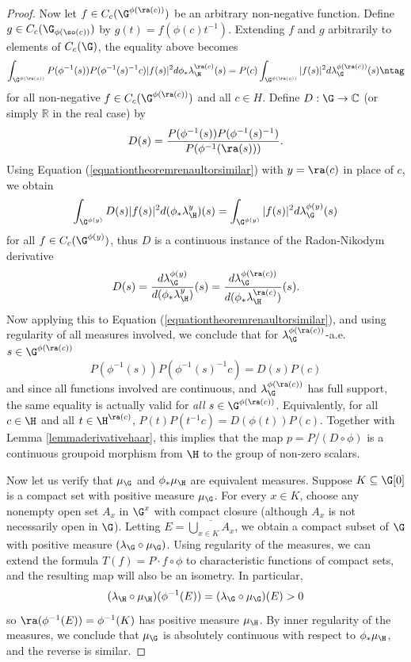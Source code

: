 \begin{proof}
Now let $f\in C_c(\G^{\phi(\ra(c))})$ be an arbitrary non-negative function. Define $g\in C_c(\G_{\phi(\so(c))})$ by $g(t)=f(\phi(c)t^{-1})$. Extending $f$ and $g$ arbitrarily to elements of $C_c(\G)$, the equality above becomes
\[\int_{\G^{\phi(\ra(c))}} P(\phi^{-1}(s))P(\phi^{-1}(s)^{-1}c)|f(s)|^2d\phi_*\lambda_{\H}^{\ra(c)}(s)=P(c)\int_{\G^{\phi(\ra(c))}} |f(s)|^2d\lambda_{\G}^{\phi(\ra(c))}(s)\ntag\label{equationtheoremrenaultorsimilar}\]
for all non-negative $f\in C_c(\G^{\phi(\ra(c))})$ and all $c\in H$. Define $D:\G\to\mathbb{C}$ (or simply $\mathbb{R}$ in the real case) by
\[D(s)=\frac{P(\phi^{-1}(s))P(\phi^{-1}(s)^{-1})}{P(\phi^{-1}(\ra(s)))}.\]
Using Equation (\ref{equationtheoremrenaultorsimilar}) with $y=\ra(c)$ in place of $c$, we obtain
\[\int_{\G^{\phi(y)}} D(s)|f(s)|^2d(\phi_*\lambda_{\H}^{y})(s)=\int_{\G^{\phi(y)}}|f(s)|^2d\lambda_{\G}^{\phi(y)}(s)\]
for all $f\in C_c(\G^{\phi(y)})$, thus $D$ is a continuous instance of the Radon-Nikodym derivative
\[D(s)=\frac{d\lambda_{\G}^{\phi(y)}}{d(\phi_*\lambda_{\H}^{y})}(s)=\frac{d\lambda_{\G}^{\phi(\ra(c))}}{d(\phi_*\lambda_{\H}^{\ra(c)})}(s).\]
Now applying this to Equation (\ref{equationtheoremrenaultorsimilar}), and using regularity of all measures involved, we conclude that for $\lambda_{\G}^{\phi(\ra(c))}$-a.e.\ $s\in\G^{\phi(\ra(c))}$
\[P(\phi^{-1}(s))P(\phi^{-1}(s)^{-1}c)=D(s)P(c)\]
and since all functions involved are continuous, and $\lambda_{\G}^{\phi(\ra(c))}$ has full support, the same equality is actually valid for \emph{all} $s\in\G^{\phi(\ra(c))}$. Equivalently, for all $c\in\H$ and all $t\in\H^{\ra(c)}$, $P(t)P(t^{-1}c)=D(\phi(t))P(c)$. Together with Lemma \ref{lemmaderivativehaar}, this implies that the map $p=P/(D\circ\phi)$ is a continuous groupoid morphism from $\H$ to the group of non-zero scalars.

Now let us verify that $\mu_{\G}$ and $\phi_*\mu_{\H}$ are equivalent measures. Suppose $K\subseteq\G[0]$ is a compact set with positive measure $\mu_{\G}$. For every $x\in K$, choose any nonempty open set $A_x$ in $\G^x$ with compact closure (although $A_x$ is not necessarily open in $\G$). Letting $E=\overline{\bigcup_{x\in K}A_x}$, we obtain a compact subset of $\G$ with positive measure $(\lambda_{\G}\circ\mu_{\G})$. Using regularity of the measures, we can extend the formula $T(f)=P\cdot f\circ\phi$ to characteristic functions of compact sets, and the resulting map will also be an isometry. In particular,
\[(\lambda_{\H}\circ\mu_{\H})(\phi^{-1}(E))=(\lambda_{\G}\circ\mu_{\G})(E)>0\]
so $\ra(\phi^{-1}(E))=\phi^{-1}(K)$ has positive measure $\mu_{\H}$. By inner regularity of the measures, we conclude that $\mu_{\G}$ is absolutely continuous with respect to $\phi_*\mu_{\H}$, and the reverse is similar.


\end{proof}
